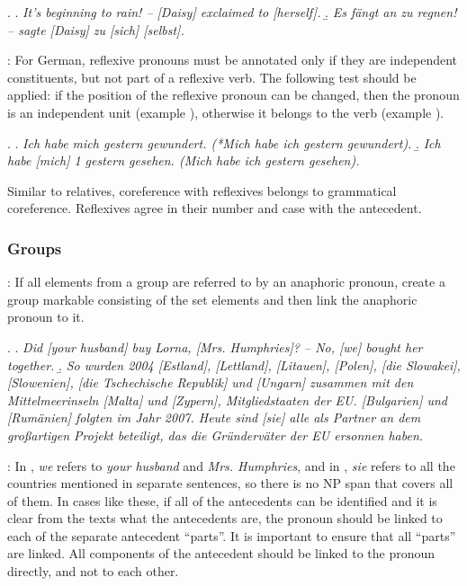 \documentclass[a4paper]{article}
\begin{document}
\ex.
\a. {\sl It's beginning to rain! -- [Daisy] exclaimed to [herself].}
\b.  {\sl Es fängt an zu regnen! -- sagte [Daisy] zu [sich] [selbst].}

\cite[p. 3]{GrishinaStedeGuide}: For German, reflexive pronouns must be annotated only if they are independent constituents, but not part of a reflexive verb. 
The following test should be applied: if the position of the reflexive pronoun can be changed, then the pronoun is an independent unit (example \Next[b]), otherwise it belongs to the verb (example \Next[a]).

\ex.
\a.  {\sl Ich habe mich gestern gewundert. (*Mich habe ich gestern gewundert).}
\b. {\sl Ich habe [mich] 1 gestern gesehen. (Mich habe ich gestern gesehen).}

Similar to relatives, coreference with reflexives belongs to grammatical coreference. Reflexives agree in their number and case with the antecedent.


\subsubsection{Groups}

\cite[p. 4]{GrishinaStedeGuide}: If all elements from a group are referred to by an anaphoric pronoun, create a group markable consisting of the set elements and then link the anaphoric pronoun to it.

\ex. 
\a. {\sl Did [your husband] buy Lorna, [Mrs. Humphries]? -- No, [we] bought her together.}
\b. {\sl So wurden 2004 [Estland], [Lettland], [Litauen], [Polen], [die Slowakei], [Slowenien], [die Tschechische Republik] und [Ungarn] zusammen mit den Mittelmeerinseln [Malta] und [Zypern], Mitgliedstaaten der EU. [Bulgarien] und [Rumänien] folgten im Jahr 2007. Heute sind [sie] alle als Partner an dem großartigen Projekt beteiligt, das die Gründerväter der EU ersonnen haben.}


\cite[p. 6]{GuillouEtAlGuide}: In \Last[a], {\sl we} refers to 
{\sl your husband} and {\sl Mrs. Humphries}, and in \Last[b], {\sl sie} refers to all the countries mentioned in separate sentences, so there is no NP span that covers all of them. In cases like these, if all of the antecedents can be identified and it is clear from the texts what the antecedents are, the pronoun should be linked to each of the separate antecedent
``parts''. It is important to ensure that all ``parts'' are linked. All components of the antecedent should be linked to the pronoun directly, and not to each other.
\end{document}
